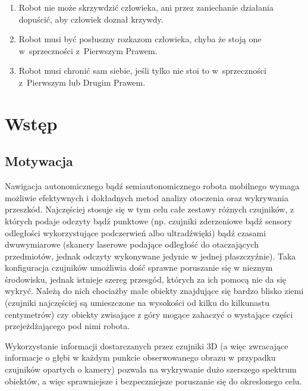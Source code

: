 

\begin{savequote}[90mm]
\begin{enumerate}
\item Robot nie może skrzywdzić człowieka, ani przez zaniechanie działania dopuścić, aby człowiek doznał krzywdy.\\
\item Robot musi być posłuszny rozkazom człowieka, chyba że stoją one w~sprzeczności z~Pierwszym Prawem.\\
\item Robot musi chronić sam siebie, jeśli tylko nie stoi to w~sprzeczności z~Pierwszym lub Drugim Prawem.\end{enumerate}
\end{savequote}


\chapter{Wstęp}
\label{chap:wstep}

\section{Motywacja}

Nawigacja autonomicznego bądź semiautonomicznego robota mobilnego wymaga możliwie
efektywnych i dokładnych metod analizy otoczenia oraz wykrywania przeszkód.
Najczęściej stosuje się w tym celu całe zestawy różnych czujników, z których
podaje odczyty bądź punktowe (np. czujniki zderzeniowe bądź sensory odległości
wykorzystujące podczerwień albo ultradźwięki) bądź czasami dwuwymiarowe (skanery
laserowe podające odległość do otaczających przedmiotów, jednak odczyty wykonywane
jedynie w jednej płaszczyźnie). Taka konfiguracja czujników umożliwia dość sprawne
poruszanie się w nieznym środowisku, jednak istnieje szereg przesgód, których za
ich pomocą nie da się wykryć. Należą do nich chociażby małe obiekty znajdujące
się bardzo blisko ziemi (czujniki najczęściej są umieszczone na wysokości od kilku
do kilkunastu centymetrów) czy obiekty zwisające z góry mogące zahaczyć o wystające
części przejeżdżającego pod nimi robota.

Wykorzystanie informacji dostarczanych przez czujniki 3D (a więc zwracające informacje
o głębi w każdym punkcie obserwowanego obrazu w przypadku czujników opartych o kamery)
pozwala na wykrywanie dużo szerszego spektrum obiektów, a więc sprawniejsze i bezpeczniejsze
poruszanie się do okreslonego celu.

